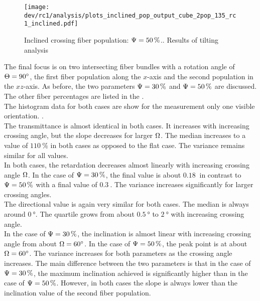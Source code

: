 %
\begin{figure}[!p]
\centering
\texttt{[image: dev/rc1/analysis/plots\_inclined\_pop\_output\_cube\_2pop\_135\_rc1\_inclined.pdf]}
\caption[]{Inclined crossing fiber population: $\textnormal{$\Psi$}=\SI{50}{\percent}$.. Results of tilting analysis}
\label{fig:inclined_05_fiber_pop_rofl}
\end{figure}
%
%
The final focus is on two intersecting fiber bundles with a rotation angle of $\textnormal{$\Theta$} = \SI{90}{\degree}$, \ie{} the first fiber population along the $x$-axis and the second population in the $xz$-axis.
As before, the two parameters $\textnormal{$\Psi$} = \SI{30}{\percent}$ and $\textnormal{$\Psi$} = \SI{50}{\percent}$ are discussed.
The other fiber percentages are listed in the \dummy[appendix]{}.
\\
%
The histogram data for both cases are show for the measurement only one visible orientation.
\dummy{}.
\\
The transmittance is almost identical in both cases.
It increases with increasing crossing angle, but the slope decreases for larger $\textnormal{$\Omega$}$.
The median increases to a value of $\SI{110}{\percent}$ in both cases as opposed to the flat case.
The variance remains similar for all values.
\\
In both cases, the retardation decreases almost linearly with increasing crossing angle $\textnormal{$\Omega$}$.
In the case of $\textnormal{$\Psi$} = \SI{30}{\percent}$, the final value is about $\SI{0.18}{}$ in contrast to $\textnormal{$\Psi$} = \SI{50}{\percent}$ with a final value of $\SI{0.3}{}$.
The variance increases significantly for larger crossing angles.
\\
The directional value is again very similar for both cases.
The median is always around $\SI{0}{\degree}$.
The quartile grows from about $\SI{0.5}{\degree}$ to $\SI{2}{\degree}$ with increasing crossing angle.
\\
In the case of $\textnormal{$\Psi$} = \SI{30}{\percent}$, the inclination is almost linear with increasing crossing angle from about $\textnormal{$\Omega$} =\SI{60}{\degree}$.
In the case of $\textnormal{$\Psi$} = \SI{50}{\percent}$, the peak point is at about $\textnormal{$\Omega$} = \SI{60}{\degree}$.
The variance increases for both parameters as the crossing angle increases.
The main difference between the two parameters is that in the case of $\textnormal{$\Psi$} = \SI{30}{\percent}$, the maximum inclination achieved is significantly higher than in the case of $\textnormal{$\Psi$} = \SI{50}{\percent}$.
However, in both cases the slope is always lower than the inclination value of the second fiber population.
